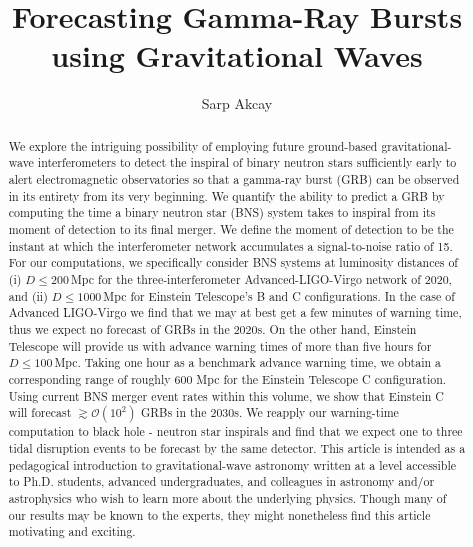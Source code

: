 \documentclass[prd,amsmath,amssymb,aps,floats,amsfonts,notitlepage,superscriptaddress,eqsecnum,nofootinbib,10pt]{revtex4-1}
\newcommand{\ord}{\mathcal{O}}
\begin{document}
\title{Forecasting Gamma-Ray Bursts using Gravitational Waves}

\author{Sarp Akcay}

\begin{abstract}
We explore the intriguing possibility of employing future ground-based gravitational-wave interferometers to detect the inspiral of binary neutron stars sufficiently
early to alert electromagnetic observatories so that a gamma-ray burst (GRB) can be observed in its entirety from its very beginning.
We quantify the ability to predict a GRB by computing the time a binary neutron star (BNS) system takes to inspiral from its moment of detection to its final merger. We define the moment of detection to be the instant at which the interferometer network accumulates a signal-to-noise ratio of 15. %
For our computations, %
we specifically consider BNS systems at luminosity distances of (i) $D\le200\,$Mpc for the three-interferometer Advanced-LIGO-Virgo network of 2020, and (ii) $D \le 1000\,$Mpc for Einstein Telescope's B and C configurations. 
In the case of Advanced LIGO-Virgo we find that we may at best get a few minutes of warning time, thus we expect no forecast of GRBs in the 2020s. 
On the other hand, Einstein Telescope will provide us with advance warning times of more than five hours for $D \le 100\,$Mpc.
Taking one hour as a benchmark advance warning time, we obtain a corresponding range of roughly 600 Mpc for the Einstein Telescope C configuration.
Using current BNS merger event rates within this volume, we show that Einstein C will forecast $\gtrsim \ord(10^2)$ GRBs in the 2030s. %
We reapply our warning-time computation to black hole - neutron star inspirals and find that we expect one to three tidal disruption events 
to be forecast by the same detector.
This article is intended as a pedagogical introduction to gravitational-wave astronomy written at a level accessible to
Ph.D. students, advanced undergraduates, and colleagues in astronomy and/or astrophysics who wish to learn more about the underlying physics.
Though many of our results may be known to the experts, they might nonetheless find this article motivating and exciting.
\end{abstract}
\maketitle
\end{document}
